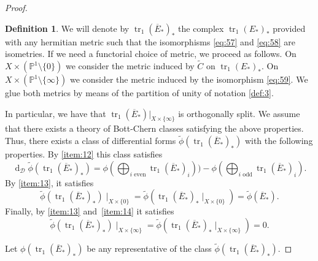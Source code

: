\documentclass[10pt,twoside]{article}
\numberwithin{equation}{section}
\theoremstyle{plain}
\theoremstyle{definition}
\newtheorem{definition}[equation]{Definition}
\DeclareMathOperator{\tr}{tr}
\DeclareMathOperator{\dd}{d}
\begin{document}
\begin{proof}
\begin{definition}\label{def:13} We will denote by $\tr_{1}(\overline
  E_{\ast})_{\ast}$ the complex $\tr_{1}(E_{\ast})_{\ast}$ provided with any
  hermitian metric such that the isomorphisms \eqref{eq:57} and
  \eqref{eq:58} are isometries. If we need a functorial choice of
  metric, we proceed as follows. On $X\times
  (\mathbb{P}^{1}\setminus \{0\})$ we consider the metric induced by
  $\widetilde C$  on
  $\tr_{1}(E_{\ast})_{\ast}$. On $X\times
  (\mathbb{P}^{1}\setminus \{\infty\})$ we consider the metric induced
  by the isomorphism \eqref{eq:59}. We glue both metrics by means of
  the partition of unity of notation \ref{def:3}.
\end{definition}
In particular, we have that $\tr_{1}(\overline E_{\ast})|_{X\times
  \{\infty \}}$ is orthogonally split.  
We assume that there
exists a theory of Bott-Chern classes satisfying the above
properties. 
 Thus, there exists a class of
differential forms
$\widetilde{\phi}(\tr_{1}(\overline{E}_{\ast})_{\ast})$ with the
following properties. By
\ref{item:12} this class satisfies
\begin{displaymath}
  \dd_{\mathcal{D}}\widetilde{\phi}(\tr_{1}(\overline{E}_{\ast})_{\ast})= 
  \phi(\bigoplus_{i\text{ even}}\tr_{1}(\overline{E}_{\ast})_{i}))- 
  \phi
  (\bigoplus_{i\text{ odd}}\tr_{1}(\overline{E}_{\ast})_{i}).  
\end{displaymath}
By \ref{item:13}, it satisfies
\begin{displaymath}
  \widetilde{\phi}(\tr_{1}(\overline{E}_{\ast})_{\ast})\mid_{X\times \{0\}}=
  \widetilde{\phi}(\tr_{1}(\overline{E}_{\ast})_{\ast}\mid_{X\times
    \{0\}})=\widetilde{\phi}(\overline{E}_{\ast}).
\end{displaymath}
Finally, by \ref{item:13} and~\ref{item:14} it satisfies
\begin{displaymath}
  \widetilde{\phi}(\tr_{1}(\overline{E}_{\ast})_{\ast})\mid_{X\times 
    \{\infty\}  } = 
  \widetilde{\phi}(\tr_{1}(\overline{E}_{\ast})_{\ast}\mid_{X\times
    \{\infty\}})=0.
\end{displaymath}

Let $\phi(\tr_{1}(\overline{E}_{\ast})_{\ast})$ be any
representative of the class
$\widetilde{\phi}(\tr_{1}(\overline{E}_{\ast})_{\ast})$. 


\end{proof}
\end{document}
